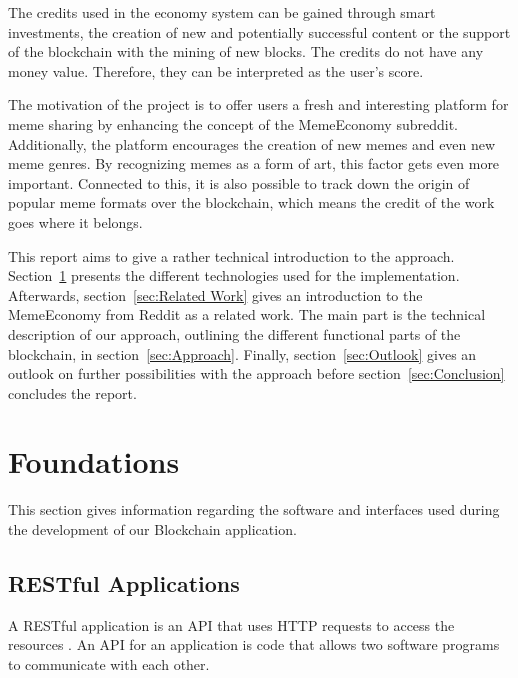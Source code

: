 \documentclass[12pt]{article}
\begin{document}
    The credits used in the economy system can be gained through smart investments, the creation of new and potentially successful content or the support of the blockchain with the mining of new blocks. The credits do not have any money value. Therefore, they can be interpreted as the user's score.
    
    The motivation of the project is to offer users a fresh and interesting platform for meme sharing by enhancing the concept of the MemeEconomy subreddit. Additionally, the platform encourages the creation of new memes and even new meme genres. By recognizing memes as a form of art, this factor gets even more important. Connected to this, it is also possible to track down the origin of popular meme formats over the blockchain, which means the credit of the work goes where it belongs.

    This report aims to give a rather technical introduction to the approach. Section~\ref{sec:Foundations} presents the different technologies used for the implementation. Afterwards, section~\ref{sec:Related Work} gives an introduction to the MemeEconomy from Reddit as a related work. The main part is the technical description of our approach, outlining the different functional parts of the blockchain, in section~\ref{sec:Approach}. Finally, section~\ref{sec:Outlook} gives an outlook on further possibilities with the approach before section~\ref{sec:Conclusion} concludes the report.


\section{Foundations} \label{sec:Foundations} %
This section gives information regarding the software and interfaces used during the development of our Blockchain application.

\subsection{RESTful Applications}

A RESTful application is an \ac{API} that uses HTTP requests to access the resources \cite{Restful}. An API for an application is code that allows two software programs to communicate with each other.
\end{document}
